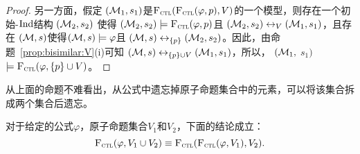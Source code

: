 \begin{proof}
	另一方面，假定 $({\cal M}_1, s_1)$是${\textsc{F}_{\textsc{ctl}}}({\textsc{F}_{\textsc{ctl}}}(\varphi, p), V)$的一个模型，则存在一个初始-$\textrm{Ind}$结构 $({\cal M}_2, s_2)$ 使得 $({\cal M}_2, s_2) \models {\textsc{F}_{\textsc{ctl}}}(\varphi, p)$且 $({\cal M}_2, s_2) \leftrightarrow_V ({\cal M}_1, s_1)$，且存在 $({\cal M}, s)$使得$({\cal M}, s) \models \varphi$且 $({\cal M}, s) \leftrightarrow_{\{p\}} ({\cal M}_2, s_2)$。因此，由命题~\ref{prop:bisimilar:V}(i)可知 $({\cal M}, s) \leftrightarrow_{\{p\} \cup V} ({\cal M}_1, s_1)$，所以， $({\cal M}_1,$ $s_1)$ $\models {\textsc{F}_{\textsc{ctl}}}(\varphi, \{p\} \cup V)$。
\end{proof}

从上面的命题不难看出，从公式中遗忘掉原子命题集合中的元素，可以将该集合拆成两个集合后遗忘。
\begin{corollary}
	对于给定的公式$\varphi$，原子命题集合$V_1$和$V_2$，下面的结论成立：
	\[
	{\textsc{F}_{\textsc{ctl}}}(\varphi,V_1\cup V_2) \equiv {\textsc{F}_{\textsc{ctl}}}({\textsc{F}_{\textsc{ctl}}}(\varphi,V_1),V_2).
	\]
\end{corollary}

